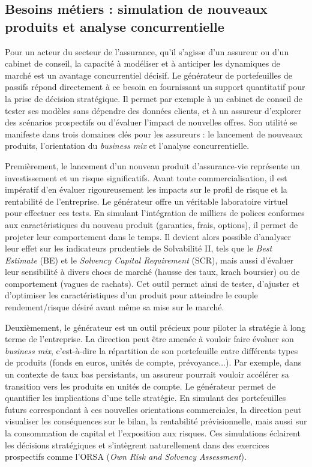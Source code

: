 \subsection{Besoins métiers : simulation de nouveaux produits et analyse concurrentielle}
Pour un acteur du secteur de l'assurance, qu'il s'agisse d'un assureur ou d'un cabinet de conseil, la capacité à modéliser et à anticiper les dynamiques de marché est un avantage concurrentiel décisif. Le générateur de portefeuilles de passifs répond directement à ce besoin en fournissant un support quantitatif pour la prise de décision stratégique. Il permet par exemple à un cabinet de conseil de tester ses modèles sans dépendre des données clients, et à un assureur d'explorer des scénarios prospectifs ou d'évaluer l'impact de nouvelles offres. Son utilité se manifeste dans trois domaines clés pour les assureurs : le lancement de nouveaux produits, l'orientation du \textit{business mix} et l'analyse concurrentielle.

Premièrement, le lancement d'un nouveau produit d'assurance-vie représente un investissement et un risque significatifs. Avant toute commercialisation, il est impératif d'en évaluer rigoureusement les impacts sur le profil de risque et la rentabilité de l'entreprise. Le générateur offre un véritable laboratoire virtuel pour effectuer ces tests. En simulant l'intégration de milliers de polices conformes aux caractéristiques du nouveau produit (garanties, frais, options), il permet de projeter leur comportement dans le temps. Il devient alors possible d'analyser leur effet sur les indicateurs prudentiels de Solvabilité II, tels que le \textit{Best Estimate} (BE) et le \textit{Solvency Capital Requirement} (SCR), mais aussi d'évaluer leur sensibilité à divers chocs de marché (hausse des taux, krach boursier) ou de comportement (vagues de rachats). Cet outil permet ainsi de tester, d'ajuster et d'optimiser les caractéristiques d'un produit pour atteindre le couple rendement/risque désiré avant même sa mise sur le marché.

Deuxièmement, le générateur est un outil précieux pour piloter la stratégie à long terme de l'entreprise. La direction peut être amenée à vouloir faire évoluer son \textit{business mix}, c'est-à-dire la répartition de son portefeuille entre différents types de produits (fonds en euros, unités de compte, prévoyance...). Par exemple, dans un contexte de taux bas persistants, un assureur pourrait vouloir accélérer sa transition vers les produits en unités de compte. Le générateur permet de quantifier les implications d'une telle stratégie. En simulant des portefeuilles futurs correspondant à ces nouvelles orientations commerciales, la direction peut visualiser les conséquences sur le bilan, la rentabilité prévisionnelle, mais aussi sur la consommation de capital et l'exposition aux risques. Ces simulations éclairent les décisions stratégiques et s'intègrent naturellement dans des exercices prospectifs comme l'ORSA (\textit{Own Risk and Solvency Assessment}).

